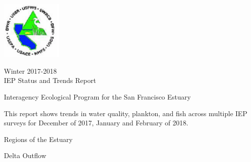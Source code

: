 \documentclass[]{article}\usepackage[]{graphicx}\usepackage[]{color}
\begin{document}
\begin{Row}
  \begin{Cell}{3}
    \begin{center}
      \vspace{15pt}
      \includegraphics[width=3cm,trim=0 0 0 0,clip,align=m]{figures/IEP_logo.PNG}
    \end{center}
  \end{Cell}
  \begin{Cell}{10}
    \begin{center}
      {\fontsize{5cm}{5.5cm}\selectfont Winter 2017-2018} \\
      \vspace{15pt}
      {\Huge IEP Status and Trends Report} \\
      \vspace{15pt}
      {\large 
        Interagency Ecological Program for the San Francisco Estuary

        This report shows trends in water quality, plankton, and fish across multiple IEP surveys for December of 2017, January and February of 2018.
      }
    \end{center}
  \end{Cell}
  \begin{Cell}{3}
    \begin{center}
    \end{center}
  \end{Cell}  
\end{Row}

\vspace{30pt}

\begin{Row}
  \begin{Cell}{2}
    \begin{center}
    \end{center}
  \end{Cell}
  \begin{Cell}{5}
    \begin{center}
      {\Huge Regions of the Estuary}
    \end{center}
  \end{Cell}
  \begin{Cell}{5}
    \begin{center}
      {\Huge Delta Outflow}
    \end{center}
  \end{Cell}
\end{Row}
\end{document}
